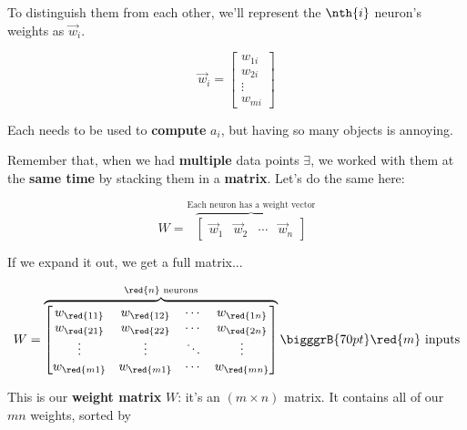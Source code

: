         To distinguish them from each other, we'll represent the $\nth{i}$ neuron's weights as $\vec{w}_i$.
        
        \begin{equation}
            \vec{w}_i = 
            \begin{bmatrix}
              w_{1i}\\w_{2i}\\ \vdots \\ w_{mi}
            \end{bmatrix}
        \end{equation}
            
        Each needs to be used to \textbf{compute} $a_i$, but having so many objects is annoying.
        
        Remember that, when we had \textbf{multiple} data points $\exi$, we worked with them at the \textbf{same time} by stacking them in a \textbf{matrix}. Let's do the same here:
        
        \begin{equation}
            W = 
            \overbrace{
                \begin{bmatrix}
                  \vec{w}_1 & \vec{w}_2 & \cdots & \vec{w}_n
                \end{bmatrix}
            }^{\text{Each neuron has a weight vector}}
        \end{equation}
        
        If we expand it out, we get a full matrix...
        
        \begin{equation}
            W = 
            \overbrace{
                \begin{bmatrix}
                  w_{\red{11}} & w_{\red{12}} & \cdots & w_{\red{1n}} \\
                  w_{\red{21}} & w_{\red{22}} & \cdots & w_{\red{2n}} \\
                  \vdots       & \vdots       & \ddots & \vdots \\
                  w_{\red{m1}} & w_{\red{m1}} & \cdots & w_{\red{mn}} \\
                \end{bmatrix}
            }^{\red{n} \text{ neurons}}
            \bigggrB{70pt} \red{m} \text{ inputs}
        \end{equation}
        
        This is our \textbf{weight matrix} $W$: it's an $(m \times n)$ matrix. It contains all of our $mn$ weights, sorted by
        

